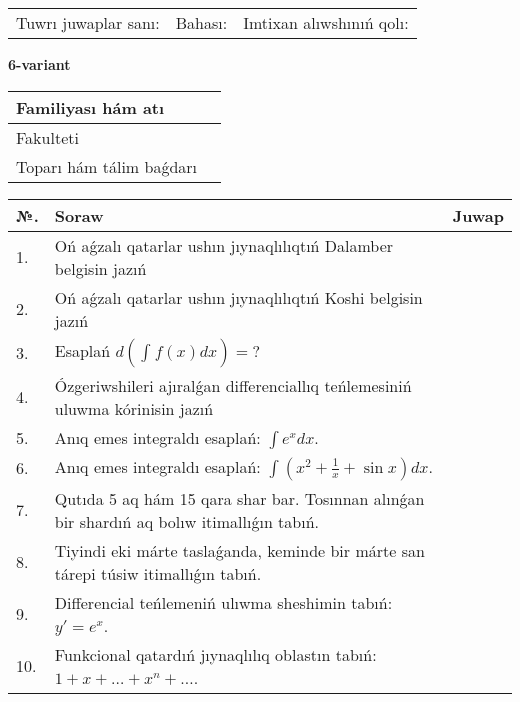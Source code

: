 \documentclass{article}
\begin{document}
\vspace{1cm}

\begin{tabular}{ c c c }
Tuwrı juwaplar sanı: \underline{\hspace{2cm}} & Bahası: \underline{\hspace{2cm}} & Imtixan alıwshınıń qolı: \underline{\hspace{2cm}} \\
\end{tabular}

\newpage

\begin{center}\textbf{6-variant}\end{center}

\bgroup
\def\arraystretch{1.5}
\begin{tabular}{ |m{6cm}|m{10cm}| }
  \hline
  Familiyası hám atı & \\
  \hline
  Fakulteti &\\
  \hline
  Toparı hám tálim baǵdarı & \\
  \hline
\end{tabular}
\egroup

\vspace{0.5cm}

\bgroup
\def\arraystretch{2}
\begin{tabular}{ |l|m{8cm}|m{7cm}| }
  \hline
  №. & Soraw & Juwap \\
  \hline
  1. & Oń aǵzalı qatarlar ushın jıynaqlılıqtıń Dalamber belgisin jazıń &  \\
  \hline
  2. & Oń aǵzalı qatarlar ushın jıynaqlılıqtıń Koshi belgisin jazıń &  \\
  \hline
  3. & Esaplań $\displaystyle d\left( \int_{}^{}{f(x)dx} \right) = ?$ &  \\
  \hline
  4. & Ózgeriwshileri ajıralǵan differenciallıq teńlemesiniń uluwma kórinisin jazıń &  \\
  \hline
  5. & Anıq emes integraldı esaplań: $\displaystyle\int e^{x}dx$. &  \\
  \hline
  6. & Anıq emes integraldı esaplań: $\displaystyle\int(x^{2}+\frac{1}{x} + \sin x)dx$. &  \\
  \hline
  7. & Qutıda 5 aq hám 15 qara shar bar. Tosınnan alınǵan bir shardıń aq bolıw itimallıǵın tabıń. &  \\
  \hline
  8. & Tiyindi eki márte taslaǵanda, keminde bir márte san tárepi túsiw itimallıǵın tabıń. &  \\
  \hline
  9. & Differencial teńlemeniń ulıwma sheshimin tabıń: $y'=e^{x}$. &  \\
  \hline
  10. & Funkcional qatardıń jıynaqlılıq oblastın tabıń: $1 + x + \ldots + x^{n} + \ldots$. &  \\
  \hline
\end{tabular}
\egroup
\end{document}
